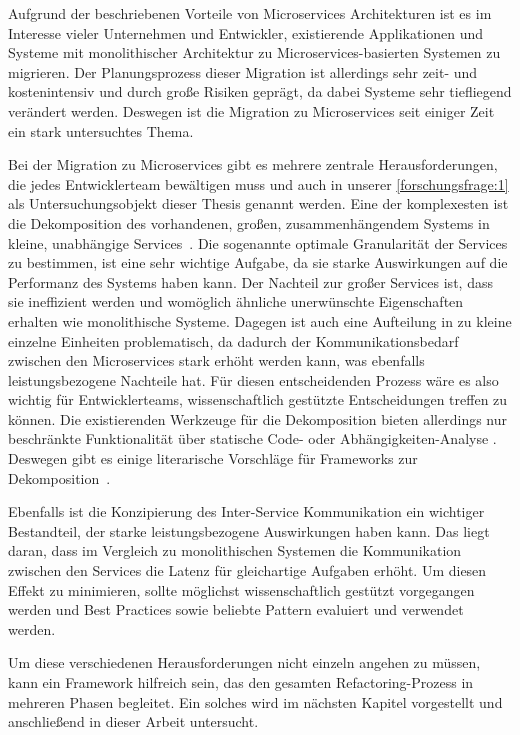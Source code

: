 Aufgrund der beschriebenen Vorteile von Microservices Architekturen ist es im Interesse vieler Unternehmen und Entwickler, existierende Applikationen und Systeme mit monolithischer Architektur zu Microservices-basierten Systemen zu migrieren.
Der Planungsprozess dieser Migration ist allerdings sehr zeit- und kostenintensiv und durch große Risiken geprägt, da dabei Systeme sehr tiefliegend verändert werden.
Deswegen ist die Migration zu Microservices seit einiger Zeit ein stark untersuchtes Thema.

Bei der Migration zu Microservices gibt es mehrere zentrale Herausforderungen, die jedes Entwicklerteam bewältigen muss und auch in unserer \cref{forschungsfrage:1} als Untersuchungsobjekt dieser Thesis genannt werden.
Eine der komplexesten ist die Dekomposition des vorhandenen, großen, zusammenhängendem Systems in kleine, unabhängige Services~\cite{a-survey-on,taibi2017processmotivations,taibi2019decomposition}.
Die sogenannte optimale Granularität der Services zu bestimmen, ist eine sehr wichtige Aufgabe, da sie starke Auswirkungen auf die Performanz des Systems haben kann.
Der Nachteil zur großer Services ist, dass sie ineffizient werden und womöglich ähnliche unerwünschte Eigenschaften erhalten wie monolithische Systeme.
Dagegen ist auch eine Aufteilung in zu kleine einzelne Einheiten problematisch, da dadurch der Kommunikationsbedarf zwischen den Microservices stark erhöht werden kann, was ebenfalls leistungsbezogene Nachteile hat.
Für diesen entscheidenden Prozess wäre es also wichtig für Entwicklerteams, wissenschaftlich gestützte Entscheidungen treffen zu können.
Die existierenden Werkzeuge für die Dekomposition bieten allerdings nur beschränkte Funktionalität über statische Code- oder Abhängigkeiten-Analyse \cite{a-survey-on}. 
Deswegen gibt es einige literarische Vorschläge für Frameworks zur Dekomposition~\cite{taibi2019decomposition,taibi2019monolithic}.

Ebenfalls ist die Konzipierung des Inter-Service Kommunikation ein wichtiger Bestandteil, der starke leistungsbezogene Auswirkungen haben kann.
Das liegt daran, dass im Vergleich zu monolithischen Systemen die Kommunikation zwischen den Services die Latenz für gleichartige Aufgaben erhöht.
Um diesen Effekt zu minimieren, sollte möglichst wissenschaftlich gestützt vorgegangen werden und Best Practices sowie beliebte Pattern evaluiert und verwendet werden.

Um diese verschiedenen Herausforderungen nicht einzeln angehen zu müssen, kann ein Framework hilfreich sein, das den gesamten Refactoring-Prozess in mehreren Phasen begleitet.
Ein solches wird im nächsten Kapitel vorgestellt und anschließend in dieser Arbeit untersucht.

